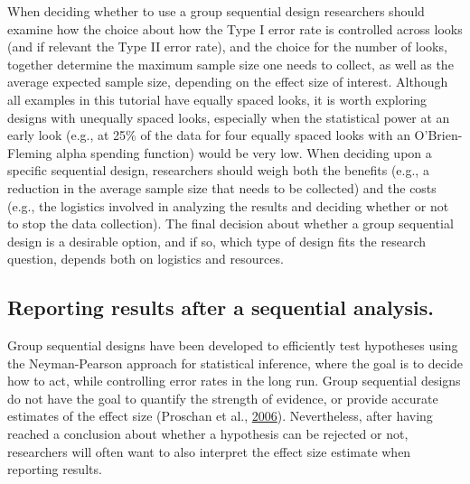 \documentclass[
  english,
  ,man,floatsintext]{apa6}
\begin{document}
When deciding whether to use a group sequential design researchers should examine how the choice about how the Type I error rate is controlled across looks (and if relevant the Type II error rate), and the choice for the number of looks, together determine the maximum sample size one needs to collect, as well as the average expected sample size, depending on the effect size of interest. Although all examples in this tutorial have equally spaced looks, it is worth exploring designs with unequally spaced looks, especially when the statistical power at an early look (e.g., at 25\% of the data for four equally spaced looks with an O'Brien-Fleming alpha spending function) would be very low. When deciding upon a specific sequential design, researchers should weigh both the benefits (e.g., a reduction in the average sample size that needs to be collected) and the costs (e.g., the logistics involved in analyzing the results and deciding whether or not to stop the data collection). The final decision about whether a group sequential design is a desirable option, and if so, which type of design fits the research question, depends both on logistics and resources.

\hypertarget{reporting-results-after-a-sequential-analysis.}{%
\subsection{Reporting results after a sequential analysis.}\label{reporting-results-after-a-sequential-analysis.}}

Group sequential designs have been developed to efficiently test hypotheses using the Neyman-Pearson approach for statistical inference, where the goal is to decide how to act, while controlling error rates in the long run. Group sequential designs do not have the goal to quantify the strength of evidence, or provide accurate estimates of the effect size (Proschan et al., \protect\hyperlink{ref-proschan_statistical_2006}{2006}). Nevertheless, after having reached a conclusion about whether a hypothesis can be rejected or not, researchers will often want to also interpret the effect size estimate when reporting results.
\end{document}
